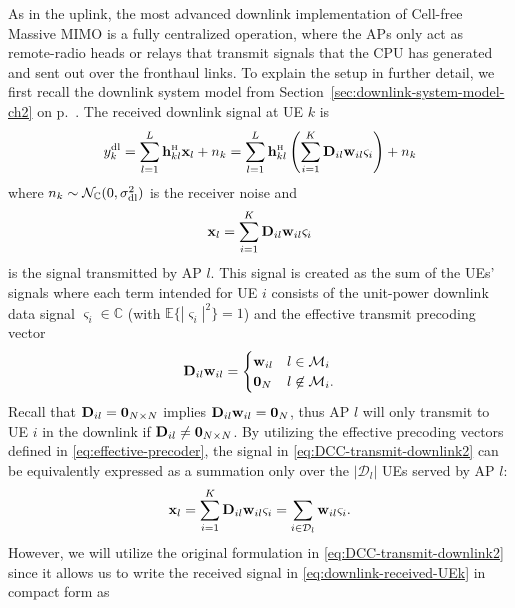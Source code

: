 As in the uplink, the most advanced downlink implementation of Cell-free Massive MIMO is a fully centralized operation, where the APs only act as remote-radio heads or relays that transmit signals that the CPU has generated and sent out over the fronthaul links. To explain the setup in further detail, we first recall the downlink system model from Section~\ref{sec:downlink-system-model-ch2} on p.~\pageref{sec:downlink-system-model-ch2}. 
The received downlink signal at UE $k$ is 
\begin{align}  \label{eq:downlink-received-UEk}
y_k^{\rm{dl}} = \sum_{l=1}^{L}  \vect{h}_{kl}^{\Htran} \vect{x}_l + n_k = \sum_{l=1}^{L}  \vect{h}_{kl}^{\Htran} \left( \sum_{i=1}^{K} \vect{D}_{il}  \vect{w}_{il} \varsigma_i \right)+ n_k
\end{align}
where $n_k \sim \mathcal{N}_{\mathbb{C}}(0,\sigma^2_{\mathrm{dl}})$ is the receiver noise and
\begin{align} 
\mathbf{x}_l = \sum_{i=1}^{K} \mathbf{D}_{il}  \mathbf{w}_{il} \varsigma_i
\label{eq:DCC-transmit-downlink2}
\end{align}
is the signal transmitted by AP $l$. This signal is created as the sum of the UEs' signals where each term intended for UE $i$ consists of the unit-power downlink data signal $\varsigma_i \in \mathbb{C}$ (with $\mathbb{E} \{|\varsigma_i|^2 \} = 1$) and the effective transmit precoding vector
\begin{equation} 
\mathbf{D}_{il}  \mathbf{w}_{il} = \begin{cases} \mathbf{w}_{il} & l \in \mathcal{M}_i \\
\mathbf{0}_{N} & l \not \in \mathcal{M}_i.
\end{cases} \label{eq:effective-precoder}
\end{equation}
Recall that $ \mathbf{D}_{il}=\mathbf{0}_{N \times N}$ implies $\mathbf{D}_{il}  \mathbf{w}_{il}=\mathbf{0}_N$, thus AP $l$ will only transmit to UE $i$ in the downlink if $ \mathbf{D}_{il} \neq \mathbf{0}_{N\times N}$.
By utilizing the effective precoding vectors defined in \eqref{eq:effective-precoder}, the signal in \eqref{eq:DCC-transmit-downlink2} can be equivalently expressed as a summation only over the $| \mathcal{D}_l |$ UEs served by AP $l$:
\begin{align} 
\mathbf{x}_l = \sum_{i=1}^{K} \mathbf{D}_{il}  \mathbf{w}_{il} \varsigma_i  = \sum_{i \in \mathcal{D}_l}  \mathbf{w}_{il} \varsigma_i.
\label{eq:DCC-transmit-downlink3}
\end{align}
However, we will utilize the original formulation in \eqref{eq:DCC-transmit-downlink2} since it allows us to write the received signal in \eqref{eq:downlink-received-UEk} in compact form as
